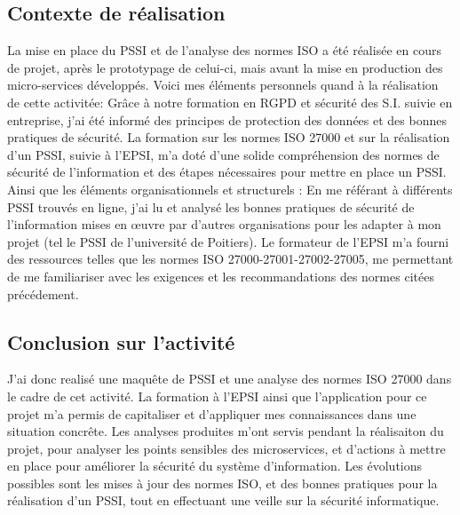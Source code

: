 \documentclass[a4paper, 11pt]{report}
\begin{document}
  \subsection{Contexte de réalisation}
La mise en place du PSSI et de l'analyse des normes ISO a été réalisée en cours de projet, après le prototypage de celui-ci, mais avant la mise en production des micro-services développés.
\newline
\newline
Voici mes éléments personnels quand à la réalisation de cette activitée:
\newline
Grâce à notre formation en RGPD et sécurité des S.I. suivie en entreprise, j'ai été informé des principes de protection des données et des bonnes pratiques de sécurité.
\newline
La formation sur les normes ISO 27000 et sur la réalisation d'un PSSI, suivie à l'EPSI, m'a doté d'une solide compréhension des normes de sécurité de l'information et des étapes nécessaires pour mettre en place un PSSI.
\newline
\newline
Ainsi que les éléments organisationnels et structurels :
\newline
En me référant à différents PSSI trouvés en ligne, j'ai lu et analysé les bonnes pratiques de sécurité de l'information mises en œuvre par d'autres organisations pour les adapter à mon projet (tel le PSSI de l'université de Poitiers).
\newline
Le formateur de l'EPSI m'a fourni des ressources telles que les normes ISO 27000-27001-27002-27005, me permettant de me familiariser avec les exigences et les recommandations des normes citées précédement.
\subsection{Conclusion sur l'activité}
J'ai donc realisé une maquête de PSSI et une analyse des normes ISO 27000 dans le cadre de cet activité. La formation à l'EPSI ainsi que l'application pour ce projet m'a permis de capitaliser et d'appliquer mes connaissances dans une situation concrête.
\newline
Les analyses produites m'ont servis pendant la réalisaiton du projet, pour analyser les points sensibles des microservices, et d'actions à mettre en place pour améliorer la sécurité du système d’information.
\newline
\newline
Les évolutions possibles sont les mises à jour des normes ISO, et des bonnes pratiques pour la réalisation d'un PSSI, tout en effectuant une veille sur la sécurité informatique.
\end{document}
